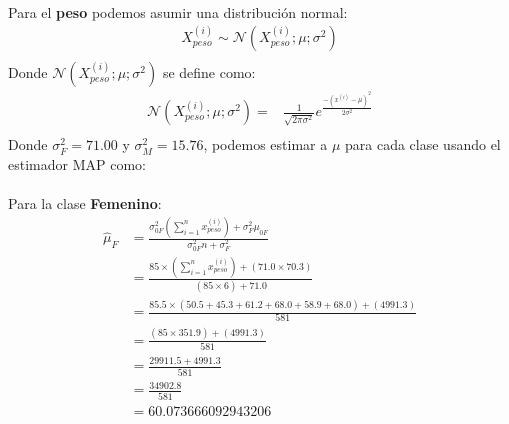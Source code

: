 \documentclass[12pt]{article}
\begin{document}
\paragraph{}Para el \textbf{peso} podemos asumir una distribución normal:
\begin{equation}
\begin{split}
X_{peso}^{(i)}\sim \mathcal{N}(X_{peso}^{(i)};\mu;\sigma^2)\\
\end{split}
\end{equation}
Donde $\mathcal{N}(X_{peso}^{(i)};\mu;\sigma^2)$ se define como:\\
\begin{equation}
\begin{split}
\mathcal{N}(X_{peso}^{(i)};\mu;\sigma^2) =& \frac{1}{\sqrt{2\pi\sigma^2}}e^{\frac{-(x^{(i)} - \mu)^2}{2\sigma^2}}\\
\end{split}
\end{equation}
Donde $\sigma_F^2 = 71.00$ y $\sigma_M^2 = 15.76$, podemos estimar a $\mu$ para cada clase usando el estimador MAP como:
\paragraph{} Para la clase \textbf{Femenino}:
\begin{equation}
\begin{split}
\hat{\mu}_{F}&=\frac{\sigma_{0F}^2(\sum_{i=1}^{n}{x_{peso}^{(i)}}) + \sigma_F^2\mu_{0F} }{\sigma_{0F}^2n + \sigma_F^2}\\
&=\frac{85\times(\sum_{i=1}^{n}{x_{peso}^{(i)}}) + (71.0\times 70.3) }{(85 \times 6) + 71.0}\\
&=\frac{85.5\times(50.5 + 45.3 + 61.2 + 68.0 + 58.9 + 68.0) + (4991.3) }{581}\\
&=\frac{(85\times 351.9) + (4991.3) }{581}\\
&=\frac{29911.5 + 4991.3 }{581}\\
&=\frac{34902.8}{581}\\
&= 60.073666092943206\\
\end{split}
\end{equation}
\end{document}
